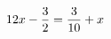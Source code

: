 \documentclass[preview]{standalone}
\begin{document}
\begin{align*}
\special{dvisvgm:raw <g id='unique000'>}12x - \frac{3}{2} = \frac{3}{10} + x\special{dvisvgm:raw </g>}
\end{align*}
\end{document}
